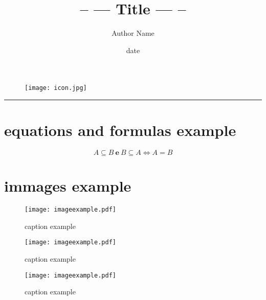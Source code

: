 \documentclass[12pt]{article}
\title{\textbf{\textit\Huge{{-- --- Title --- --}}}}
\author{Author Name}
\date{date}
\begin{document}
   
\maketitle  
\thispagestyle{empty}
\vspace{150px}
\begin{figure}[H]
    \centering
    
    \texttt{[image: icon.jpg]}
    
\end{figure}
\newpage
\thispagestyle{empty}
\par\noindent\rule{\textwidth}{0.8pt}
\tableofcontents
\newpage

\section{equations and formulas example}

\vspace{20px}
\begin{center}
\begin{tcolorbox}[width=0.70\textwidth]
\begin{equation}\nonumber
    A \subseteq B \:\textbf{e}\: B \subseteq A\Longleftrightarrow A=B
\end{equation}
\end{tcolorbox}
\end{center}
\vspace{20px}

\section{immages example}

\begin{figure}[H]
    \centering
    \texttt{[image: imageexample.pdf]}
    \caption*{caption example}
\end{figure}

\begin{multicols}{2}
\begin{figure}[H]
    \centering
    \texttt{[image: imageexample.pdf]}
    \caption*{caption example}
\end{figure}
\columnbreak
\begin{figure}[H]
    \centering
    \texttt{[image: imageexample.pdf]}
    \caption*{caption example}
\end{figure}
\end{multicols}
\end{document}
